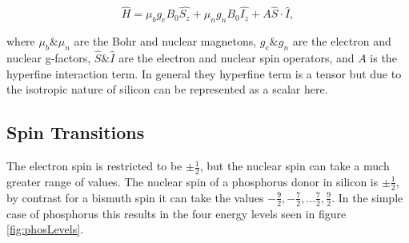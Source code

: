 \begin{equation}
\hat{H} = \mu_bg_eB_0\hat{S_z} + \mu_ng_nB_0\hat{I_z} + A \hat{S}\cdot\hat{I},
\end{equation}

where $\mu_b \text{\&} \mu_n$ are the Bohr and nuclear magnetons, $g_e \text{\&} g_n$ are the electron and nuclear g-factors, $\hat{S} \text{\&} \hat{I}$ are the electron and nuclear spin operators, and $A$ is the hyperfine interaction term.
In general they hyperfine term is a tensor but due to the isotropic nature of silicon can be represented as a scalar here.

\subsection{Spin Transitions}

The electron spin is restricted to be $\pm \frac{1}{2}$, but the nuclear spin can take a much greater range of values. 
The nuclear spin of a phosphorus donor in silicon is $\pm \frac{1}{2}$, by contrast for a bismuth spin it can take the values $-\frac{9}{2}, -\frac{7}{2},...\frac{7}{2},\frac{9}{2}$. 
In the simple case of phosphorus this results in the four energy levels seen in figure \ref{fig:phosLevels}.

